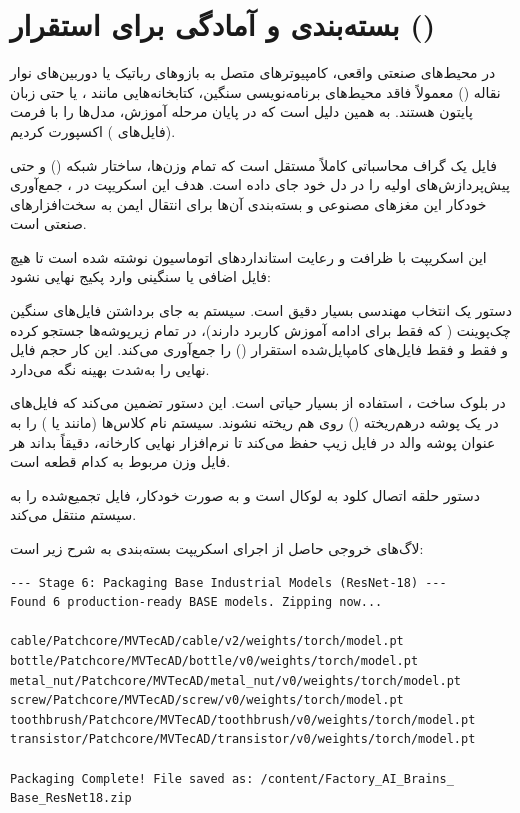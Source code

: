 \documentclass{article}
\begin{document}
\section{بسته‌بندی و آمادگی برای استقرار ()}


در محیط‌های صنعتی واقعی، کامپیوترهای متصل به بازوهای رباتیک یا دوربین‌های نوار نقاله () معمولاً فاقد محیط‌های برنامه‌نویسی سنگین، کتابخانه‌هایی مانند ، یا حتی زبان پایتون هستند. به همین دلیل است که در پایان مرحله آموزش، مدل‌ها را با فرمت  (فایل‌های ) اکسپورت کردیم.

فایل  یک گراف محاسباتی کاملاً مستقل است که تمام وزن‌ها، ساختار شبکه () و حتی پیش‌پردازش‌های اولیه را در دل خود جای داده است. هدف این اسکریپت در ، جمع‌آوری خودکار این مغزهای مصنوعی و بسته‌بندی آن‌ها برای انتقال ایمن به سخت‌افزارهای صنعتی است.

این اسکریپت با ظرافت و رعایت استانداردهای اتوماسیون نوشته شده است تا هیچ فایل اضافی یا سنگینی وارد پکیج نهایی نشود:


دستور  یک انتخاب مهندسی بسیار دقیق است. سیستم به جای برداشتن فایل‌های سنگین چک‌پوینت ( که فقط برای ادامه آموزش کاربرد دارند)، در تمام زیرپوشه‌ها جستجو کرده و فقط و فقط فایل‌های کامپایل‌شده استقرار () را جمع‌آوری می‌کند. این کار حجم فایل نهایی را به‌شدت بهینه نگه می‌دارد.

در بلوک ساخت ، استفاده از  بسیار حیاتی است. این دستور تضمین می‌کند که فایل‌های  در یک پوشه درهم‌ریخته () روی هم ریخته نشوند. سیستم نام کلاس‌ها (مانند  یا ) را به عنوان پوشه والد در فایل زیپ حفظ می‌کند تا نرم‌افزار نهایی کارخانه، دقیقاً بداند هر فایل وزن مربوط به کدام قطعه است.


دستور  حلقه اتصال کلود به لوکال است و به صورت خودکار، فایل تجمیع‌شده را به سیستم منتقل می‌کند.


لاگ‌های خروجی حاصل از اجرای اسکریپت بسته‌بندی به شرح زیر است:


\begin{tcolorbox}[colback=Tan!15, colframe=MidnightBlue]
	\begin{latin}
		\begin{verbatim}
--- Stage 6: Packaging Base Industrial Models (ResNet-18) ---
Found 6 production-ready BASE models. Zipping now...

cable/Patchcore/MVTecAD/cable/v2/weights/torch/model.pt
bottle/Patchcore/MVTecAD/bottle/v0/weights/torch/model.pt
metal_nut/Patchcore/MVTecAD/metal_nut/v0/weights/torch/model.pt
screw/Patchcore/MVTecAD/screw/v0/weights/torch/model.pt
toothbrush/Patchcore/MVTecAD/toothbrush/v0/weights/torch/model.pt
transistor/Patchcore/MVTecAD/transistor/v0/weights/torch/model.pt

Packaging Complete! File saved as: /content/Factory_AI_Brains_
Base_ResNet18.zip
		\end{verbatim}
	\end{latin}
\end{tcolorbox}
\end{document}
